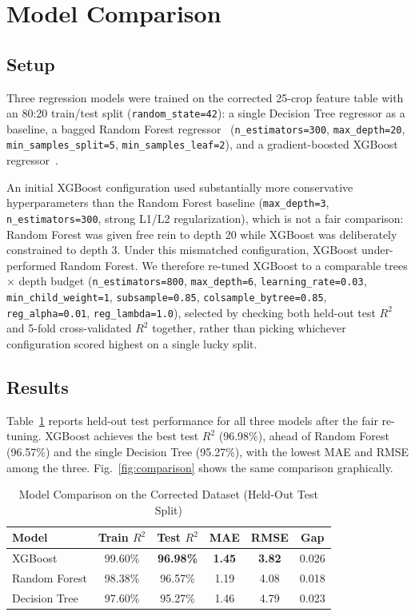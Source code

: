 \documentclass[conference]{IEEEtran}
\begin{document}
\section{Model Comparison}

\subsection{Setup}

Three regression models were trained on the corrected 25-crop feature table with an
80:20 train/test split (\texttt{random\_state=42}): a single Decision Tree regressor
as a baseline, a bagged Random Forest regressor~\cite{biau2016}
(\texttt{n\_estimators=300}, \texttt{max\_depth=20}, \texttt{min\_samples\_split=5},
\texttt{min\_samples\_leaf=2}), and a gradient-boosted XGBoost regressor~\cite{chen2016}.

An initial XGBoost configuration used substantially more conservative hyperparameters
than the Random Forest baseline (\texttt{max\_depth=3}, \texttt{n\_estimators=300},
strong L1/L2 regularization), which is not a fair comparison: Random Forest was given
free rein to depth 20 while XGBoost was deliberately constrained to depth 3. Under
this mismatched configuration, XGBoost under-performed Random Forest. We therefore
re-tuned XGBoost to a comparable trees $\times$ depth budget
(\texttt{n\_estimators=800}, \texttt{max\_depth=6}, \texttt{learning\_rate=0.03},
\texttt{min\_child\_weight=1}, \texttt{subsample=0.85}, \texttt{colsample\_bytree=0.85},
\texttt{reg\_alpha=0.01}, \texttt{reg\_lambda=1.0}), selected by checking both
held-out test $R^2$ and 5-fold cross-validated $R^2$ together, rather than picking
whichever configuration scored highest on a single lucky split.

\subsection{Results}

Table~\ref{tab:results} reports held-out test performance for all three models after
the fair re-tuning. XGBoost achieves the best test $R^2$ (96.98\%), ahead of Random
Forest (96.57\%) and the single Decision Tree (95.27\%), with the lowest MAE and RMSE
among the three. Fig.~\ref{fig:comparison} shows the same comparison graphically.

\begin{table}[htbp]
\caption{Model Comparison on the Corrected Dataset (Held-Out Test Split)}
\label{tab:results}
\centering
\begin{tabular}{lccccc}
\toprule
Model & Train $R^2$ & Test $R^2$ & MAE & RMSE & Gap \\
\midrule
XGBoost & 99.60\% & \textbf{96.98\%} & \textbf{1.45} & \textbf{3.82} & 0.026 \\
Random Forest & 98.38\% & 96.57\% & 1.19 & 4.08 & 0.018 \\
Decision Tree & 97.60\% & 95.27\% & 1.46 & 4.79 & 0.023 \\
\bottomrule
\end{tabular}
\end{table}
\end{document}
